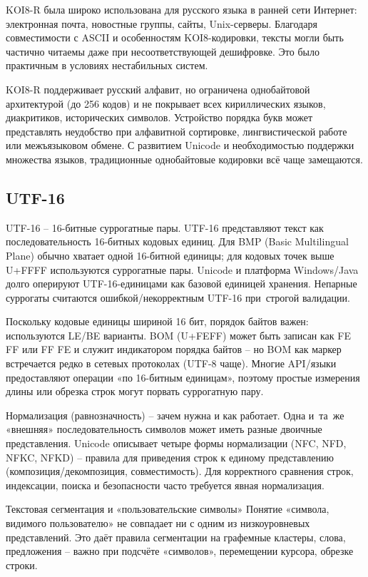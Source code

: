 \documentclass{ou}
\begin{document}
KOI8-R была широко использована для русского языка в ранней сети Интернет: электронная почта, новостные группы, сайты, Unix-серверы. Благодаря совместимости с ASCII и особенностям KOI8-кодировки, тексты могли быть частично читаемы даже при несоответствующей дешифровке. Это было практичным в условиях нестабильных систем. 

KOI8-R поддерживает русский алфавит, но ограничена однобайтовой архитектурой (до 256 кодов) и не покрывает всех кириллических языков, диакритиков, исторических символов. Устройство порядка букв может представлять неудобство при алфавитной сортировке, лингвистической работе или межъязыковом обмене. С развитием Unicode и необходимостью поддержки множества языков, традиционные однобайтовые кодировки всё чаще замещаются.
\subsection{UTF-16}
UTF-16 -- 16-битные суррогатные пары. UTF-16 представляют текст как последовательность 16-битных кодовых единиц. Для BMP (Basic Multilingual Plane) обычно хватает одной 16-битной единицы; для кодовых точек выше U+FFFF используются суррогатные пары. Unicode и платформа Windows/Java долго оперируют UTF-16-единицами как базовой единицей хранения. Непарные суррогаты считаются ошибкой/некорректным UTF-16 при~строгой валидации.
 
Поскольку кодовые единицы шириной 16 бит, порядок байтов важен: используются LE/BE варианты. BOM (U+FEFF) может быть записан как FE FF или FF FE и служит индикатором порядка байтов -- но BOM как маркер встречается редко в сетевых протоколах (UTF-8 чаще). Многие API/языки предоставляют операции «по 16-битным единицам», поэтому простые измерения длины или обрезка строк могут порвать суррогатную пару. 

Нормализация (равнозначность) -- зачем нужна и как работает. Одна и~та~же «внешняя» последовательность символов может иметь разные двоичные представления. Unicode описывает четыре формы нормализации (NFC, NFD, NFKC, NFKD) -- правила для приведения строк к единому представлению (композиция/декомпозиция, совместимость). Для корректного сравнения строк, индексации, поиска и безопасности часто требуется явная нормализация.

Текстовая сегментация и «пользовательские символы» Понятие «символа, видимого пользователю» не совпадает ни с одним из низкоуровневых представлений. Это даёт правила сегментации на графемные кластеры, слова, предложения -- важно при подсчёте «символов», перемещении курсора, обрезке строки. 
\end{document}
